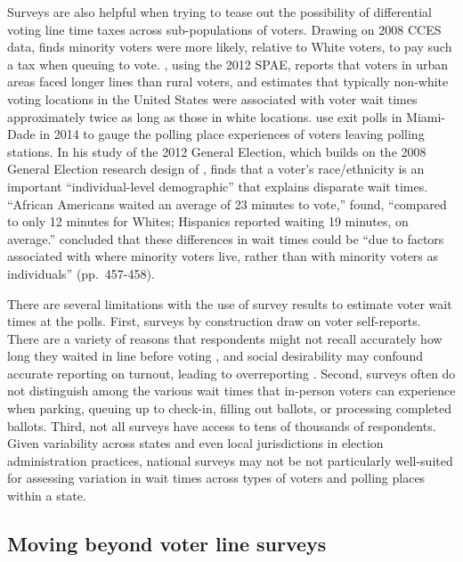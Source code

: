 \documentclass[12pt,titlepage]{article}
\begin{document}
Surveys are also helpful when trying to tease out the possibility of
differential voting line time taxes across sub-populations of voters.
Drawing on 2008 CCES data, \cite{mukherjee:timetax} finds minority
voters were more likely, relative to White voters, to pay such a tax
when queuing to vote. \citet{kimball:voting}, using the 2012 SPAE,
reports that voters in urban areas faced longer lines than rural
voters, and \citet{pettigrew:racegapwaittimes} estimates that
typically non-white voting locations in the United States were
associated with voter wait times approximately twice as long as those
in white locations.  \cite{herron:confidence} use exit polls in
Miami-Dade in 2014 to gauge the polling place experiences of voters
leaving polling stations.  In his study of the 2012 General Election,
which builds on the 2008 General Election research design of
\citet{alvarez:survey}, \cite{stewart:waitingtovote2012} finds that a
voter's race/ethnicity is an important ``individual-level
demographic'' that explains disparate wait times.  ``African Americans
waited an average of 23 minutes to vote,''
\citeauthor{stewart:waitingtovote2012} found, ``compared to only 12
minutes for Whites; Hispanics reported waiting 19 minutes, on
average.''  \citeauthor{stewart:waitingtovote2012} concluded that
these differences in wait times could be ``due to factors associated
with where minority voters live, rather than with minority voters as
individuals'' (pp.\ 457-458).

There are several limitations with the use of survey results to
estimate voter wait times at the polls. First, surveys by construction
draw on voter self-reports.  There are a variety of reasons that
respondents might not recall accurately how long they waited in line
before voting \citep[e.g.,][]{sackettetal:timeflies}, and social
desirability may confound accurate reporting on turnout, leading to
overreporting \citep{ansolhersh:bigdata}.  Second, surveys often do
not distinguish among the various wait times that in-person voters can
experience when parking, queuing up to check-in, filling out ballots,
or processing completed ballots. Third, not all surveys have access to
tens of thousands of respondents.  Given variability across states and
even local jurisdictions in election administration practices,
national surveys may not be not particularly well-suited for assessing
variation in wait times across types of voters and polling places
within a state.

\subsection*{Moving beyond voter line surveys}
\end{document}
